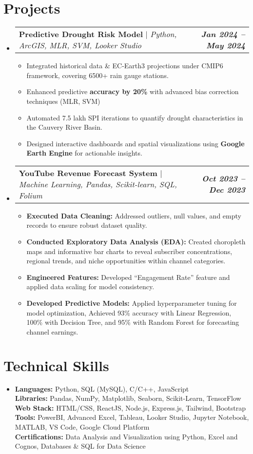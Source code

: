 \documentclass[letterpaper,11pt]{article}
\makeatletter
\newcommand{\resumeProjectHeading}[2]{
    \item
    \begin{tabular*}{0.97\textwidth}{l@{\extracolsep{\fill}}r}
      \small#1 & \textit{\textbf{\small#2}} \\
    \end{tabular*}\vspace{-7pt}
}
\newcommand{\resumeItem}[1]{
  \item\small{
    {#1 \vspace{-2pt}}
  }
}
\newcommand{\resumeSubHeadingListStart}{\begin{itemize}[leftmargin=0.15in, label={}]}
\newcommand{\resumeSubHeadingListEnd}{\end{itemize}}
\newcommand{\resumeItemListStart}{\begin{itemize}}
\newcommand{\resumeItemListEnd}{\end{itemize}\vspace{-5pt}}
\makeatother
\begin{document}
\section{Projects}
    \resumeSubHeadingListStart
      \resumeProjectHeading
          {\textbf{Predictive Drought Risk Model} $|$ \emph{Python, ArcGIS, MLR, SVM, Looker Studio}}{Jan 2024 -- May 2024}
          \resumeItemListStart
            \resumeItem{Integrated historical data \& EC-Earth3 projections under CMIP6 framework, covering 6500+ rain gauge stations.}
            \resumeItem{Enhanced predictive \textbf{accuracy by 20\%} with advanced bias correction techniques (MLR, SVM)}
            \resumeItem{Automated 7.5 lakh SPI iterations to quantify drought characteristics in the Cauvery River Basin.}
            \resumeItem{Designed interactive dashboards and spatial visualizations using \textbf{Google Earth Engine} for actionable insights.}
          \resumeItemListEnd
          
      \resumeProjectHeading
          {\textbf{YouTube Revenue Forecast System} $|$ \emph{Machine Learning, Pandas, Scikit-learn, SQL, Folium}}{Oct 2023 -- Dec 2023}
          \resumeItemListStart
            \resumeItem{\textbf{Executed Data Cleaning:} Addressed outliers, null values, and empty records to ensure robust dataset quality.}
            \resumeItem{\textbf{Conducted Exploratory Data Analysis (EDA):} Created choropleth maps and informative bar charts to reveal subscriber concentrations, regional trends, and niche opportunities within channel categories.}
            \resumeItem{\textbf{Engineered Features:} Developed “Engagement Rate” feature and applied data scaling for model consistency.}
            \resumeItem{\textbf{Developed Predictive Models:} Applied hyperparameter tuning for model optimization, Achieved 93\% accuracy with Linear Regression, 100\% with Decision Tree, and 95\% with Random Forest for forecasting channel earnings.}
          \resumeItemListEnd
    \resumeSubHeadingListEnd


\section{Technical Skills}
 \begin{itemize}[leftmargin=0.15in, label={}]
    \small \item{
         \textbf{Languages:}{ Python, SQL (MySQL), C/C++, JavaScript} \\
         \textbf{Libraries:}{ Pandas, NumPy, Matplotlib, Seaborn, Scikit-Learn, TensorFlow} \\
         \textbf{Web Stack:}{ HTML/CSS, ReactJS, Node.js, Express.js, Tailwind, Bootstrap} \\
         \textbf{Tools:}{ PowerBI, Advanced Excel, Tableau, Looker Studio, Jupyter Notebook, MATLAB, VS Code, Google Cloud Platform} \\
         \textbf{Certifications:}{ Data Analysis and Visualization using Python, Excel and Cognos, Databases \& SQL for Data Science}
    } \vspace{-5pt}
 \end{itemize} \vspace{-5pt}
\end{document}
